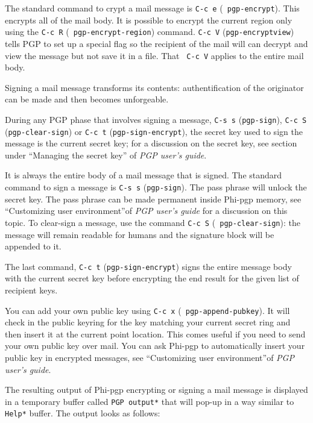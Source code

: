The standard command to   crypt a mail   message is {\tt C-c e}  ({\tt
pgp-encrypt}).  This encrypts all of the mail body.  It is possible to
encrypt   the current  region  only   using  the  {\tt   C-c R}  ({\tt
pgp-encrypt-region}) command.   {\tt C-c  V} ({\tt pgp-encrypt\-view})
tells PGP to set up a special  flag so the  recipient of the mail will
can decrypt and view the message but not save  it in a file. That {\tt
C-c V} applies to the entire mail body.

Signing a mail  message  transforms its contents:  authentification of
the originator can be made and then becomes unforgeable.

During any  PGP phase  that involves  signing  a message, {\tt C-s  s}
({\tt pgp-sign}), {\tt C-c S}  ({\tt pgp-clear-sign})  or {\tt C-c  t}
({\tt pgp-sign-encrypt}),  the secret key  used to sign the message is
the current secret  key;  for a discussion   on  the secret  key,  see
section under ``Managing the secret key'' of {\it PGP user's guide}.

It is always the entire  body of a mail  message that is signed.   The
standard command to  sign a message  is {\tt C-s s} ({\tt  pgp-sign}).
The  pass phrase will unlock  the secret key.  The pass  phrase can be
made permanent inside     Phi-pgp  memory, see  ``Customizing     user
environment''of {\it PGP user's guide} for a discussion on this topic.
To   clear-sign  a message,   use   the  command {\tt   C-c   S} ({\tt
pgp-clear-sign}): the message  will remain readable  for humans and the
signature block will be appended to it.

The last command, {\tt C-c t} ({\tt pgp-sign-encrypt}) signs the entire
message body with the current secret key before encrypting the end result
for the given list of recipient keys.

You    can  add  your   own  public   key  using   {\tt  C-c  x} ({\tt
pgp-append-pubkey}).  It will check in the public keyring for the key
matching  your current secret  ring and then insert  it at the current
point location. This comes useful if you  need to send your own public
key over mail. You can ask Phi-pgp to automatically insert your public
key in encrypted messages, see ``Customizing user environment''of {\it
PGP user's guide}.

The resulting output of Phi-pgp  encrypting or signing a mail  message
is displayed in a temporary buffer called {\tt *PGP output*} that will
pop-up in a  way similar to {\tt  *Help*} buffer. The output looks  as
follows:

